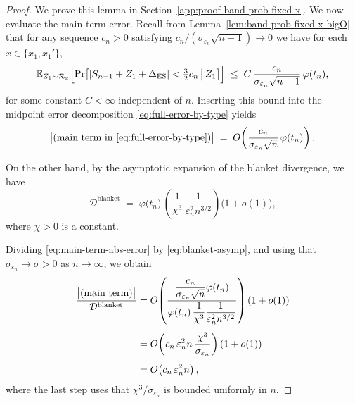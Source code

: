 \documentclass{article}
\theoremstyle{plain}
\theoremstyle{definition}
\begin{document}
\begin{proof}
We prove this lemma in Section~\ref{app:proof-band-prob-fixed-x}.
We now evaluate the main-term error.
Recall from Lemma~\ref{lem:band-prob-fixed-x-bigO} that for any sequence
$c_n>0$ satisfying $c_n / (\sigma_{\varepsilon_n}\sqrt{n-1}) \to 0$ we have
for each $x \in \{x_1,x_1'\}$,
\begin{equation}
  \label{eq:band-prob-recall}
  \mathbb E_{Z_1\sim\mathcal R_x}\Bigl[
    \Pr\bigl[
      |S_{n-1} + Z_1 + \Delta_{\mathrm{ES}}|
      < \tfrac{3}{2}c_n
      \,\big|\,
      Z_1
    \bigr]
  \Bigr]
  \;\le\;
  C \,\frac{c_n}{\sigma_{\varepsilon_n}\sqrt{n-1}}\,
  \varphi(t_n),
\end{equation}
for some constant $C<\infty$ independent of $n$.
Inserting this bound into the midpoint error decomposition
\eqref{eq:full-error-by-type} yields
\begin{equation}
  \label{eq:main-term-abs-error}
  \bigl|\text{(main term in \eqref{eq:full-error-by-type})}\bigr|
  \;=\;
  O\!\left(
    \frac{c_n}{\sigma_{\varepsilon_n}\sqrt{n}}\,
    \varphi(t_n)
  \right).
\end{equation}

On the other hand, by the asymptotic expansion of the blanket divergence,
we have
\begin{equation}
  \label{eq:blanket-asymp}
  \mathcal{D}^{\mathrm{blanket}}
  \;=\;
  \varphi\bigl(t_n\bigr)\,
  \left(
    \frac{1}{\chi^3}\,
    \frac{1}{\varepsilon_n^2 n^{3/2}}
  \right)\bigl(1+o(1)\bigr),
\end{equation}
where $\chi>0$ is a constant.

Dividing \eqref{eq:main-term-abs-error} by \eqref{eq:blanket-asymp}, and
using that $\sigma_{\varepsilon_n}\to\sigma>0$ as $n\to\infty$, we obtain
\begin{align}
  \frac{\bigl|\text{(main term)}\bigr|}{\mathcal{D}^{\mathrm{blanket}}}
  &=
  O\!\left(
    \frac{\dfrac{c_n}{\sigma_{\varepsilon_n}\sqrt{n}}\varphi(t_n)}
         {\varphi(t_n)\,\dfrac{1}{\chi^3}\dfrac{1}{\varepsilon_n^2 n^{3/2}}}
  \right)
  (1+o(1))
  \notag\\[4pt]
  &=
  O\!\left(
    c_n \,\varepsilon_n^2 n \,\frac{\chi^3}{\sigma_{\varepsilon_n}}
  \right)
  (1+o(1))
  \notag\\[4pt]
  &=
  O\!\left(
    c_n \,\varepsilon_n^2 n
  \right),
  \label{eq:main-term-rel-error}
\end{align}
where the last step uses that $\chi^3/\sigma_{\varepsilon_n}$ is bounded
uniformly in $n$.


\end{proof}
\end{document}
